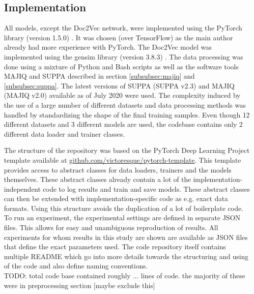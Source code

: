 \subsection{Implementation} \label{subsec:implementation_details}
All models, except the Doc2Vec network, were implemented using the PyTorch library (version 1.5.0) \cite{pytorch}. It was chosen (over TensorFlow) as the main author already had more experience with PyTorch. The Doc2Vec model was implemented using the gensim library (version 3.8.3) \cite{gensim}. The data processing was done using a mixture of Python and Bash scripts as well as the software tools MAJIQ and SUPPA described in section \ref{subsubsec:majiq} and \ref{subsubsec:suppa}. The latest versions of SUPPA (SUPPA v2.3) and MAJIQ (MAJIQ v2.0) available as of July 2020 were used. The complexity induced by the use of a large number of different datasets and data processing methods was handled by standardizing the shape of the final training samples. Even though 12 different datasets and 3 different models are used, the codebase contains only 2 different data loader and trainer classes.


The structure of the repository was based on the PyTorch Deep Learning Project template available at \url{github.com/victoresque/pytorch-template}. This template provides access to abstract classes for data loaders, trainers and the models themselves. These abstract classes already contain a lot of the implementation-independent code to log results and train and save models. These abstract classes can then be extended with implementation-specific code as e.g. exact data formats. Using this structure avoids the duplication of a lot of boilerplate code.\\
To run an experiment, the experimental settings are defined in separate JSON files. This allows for easy and unambiguous reproduction of results. All experiments for whom results in this study are shown are available as JSON files that define the exact parameters used.
The code repository itself contains multiple README which go into more details towards the structuring and using of the code and also define naming conventions.\\

TODO: total code base contained roughly ... lines of code. the majority of these were in preprocessing section [maybe exclude this]

